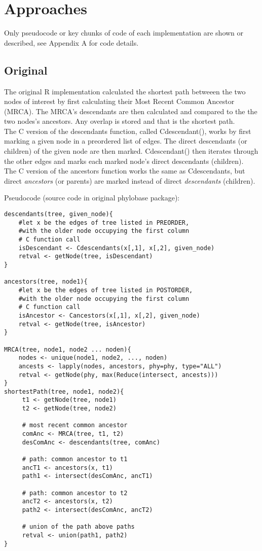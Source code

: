 \documentclass[11pt,letterpaper]{article}
\begin{document}
\section{Approaches}

Only pseudocode or key chunks of code of each implementation are shown or described,
see Appendix A for code details.

\subsection{Original}
The original R implementation calculated the shortest path betweeen the two nodes of interest by first calculating their Most Recent Common Ancestor (MRCA). The MRCA's descendants are then calculated and compared to the the two nodes's ancestors. Any overlap is stored and that is the shortest path. \\
The C version of the descendants function, called Cdescendant(), works by first marking a given node in a preordered list of edges. The direct descendants (or children) of the given node are then marked. Cdescendant() then iterates through the other edges and marks each marked node's direct descendants (children).\\
The C version of the ancestors function works the same as Cdescendants, but direct \textit{ancestors} (or parents) are marked instead of direct \textit{descendants} (children).

Pseudocode (source code in original phylobase package):
\begin{lstlisting}[style=MyR]
descendants(tree, given_node){
	#let x be the edges of tree listed in PREORDER,
	#with the older node occupying the first column
	# C function call
	isDescendant <- Cdescendants(x[,1], x[,2], given_node)
	retval <- getNode(tree, isDescendant)
}

ancestors(tree, node1){
	#let x be the edges of tree listed in POSTORDER,
	#with the older node occupying the first column
	# C function call
	isAncestor <- Cancestors(x[,1], x[,2], given_node)
	retval <- getNode(tree, isAncestor)
}

MRCA(tree, node1, node2 ... noden){
	nodes <- unique(node1, node2, ..., noden)
	ancests <- lapply(nodes, ancestors, phy=phy, type="ALL")
    retval <- getNode(phy, max(Reduce(intersect, ancests)))
}
shortestPath(tree, node1, node2){
     t1 <- getNode(tree, node1)
     t2 <- getNode(tree, node2)

     # most recent common ancestor
     comAnc <- MRCA(tree, t1, t2) 
     desComAnc <- descendants(tree, comAnc)

     # path: common ancestor to t1
     ancT1 <- ancestors(x, t1)
     path1 <- intersect(desComAnc, ancT1) 

     # path: common ancestor to t2
     ancT2 <- ancestors(x, t2)
     path2 <- intersect(desComAnc, ancT2)

     # union of the path above paths
     retval <- union(path1, path2)
}
\end{lstlisting}
\end{document}

